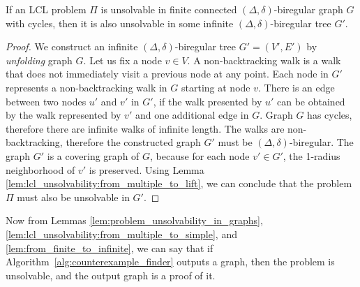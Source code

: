 \begin{lemma} \label{lem:from_finite_to_infinite}
    If an LCL problem $\Pi$ is unsolvable in finite connected $(\Delta, \delta)$-biregular graph $G$ with cycles, then it is also unsolvable in some infinite $(\Delta, \delta)$-biregular tree $G'$.
\end{lemma}
\begin{proof}
    We construct an infinite $(\Delta, \delta)$-biregular tree $G'=(V', E')$ by \emph{unfolding} graph $G$.
    Let us fix a node $v \in V$.
    A non-backtracking walk is a walk that does not immediately visit a previous node at any point.
    Each node in $G'$ represents a non-backtracking walk in $G$ starting at node $v$.
    There is an edge between two nodes $u'$ and $v'$ in $G'$, if the walk presented by $u'$ can be obtained by the walk represented by $v'$ and one additional edge in $G$.
    Graph $G$ has cycles, therefore there are infinite walks of infinite length.
    The walks are non-backtracking, therefore the constructed graph $G'$ must be $(\Delta, \delta)$-biregular.
    The graph $G'$ is a covering graph of $G$, because for each node $v' \in G'$, the 1-radius neighborhood of $v'$ is preserved.
    Using Lemma \ref{lem:lcl_unsolvability:from_multiple_to_lift}, we can conclude that the problem $\Pi$ must also be unsolvable in $G'$.
\end{proof}


Now from Lemmas \ref{lem:problem_unsolvability_in_graphs}, \ref{lem:lcl_unsolvability:from_multiple_to_simple}, and \ref{lem:from_finite_to_infinite}, we can say that if Algorithm~\ref{alg:counterexample_finder} outputs a graph, then the problem is unsolvable, and the output graph is a proof of it.

